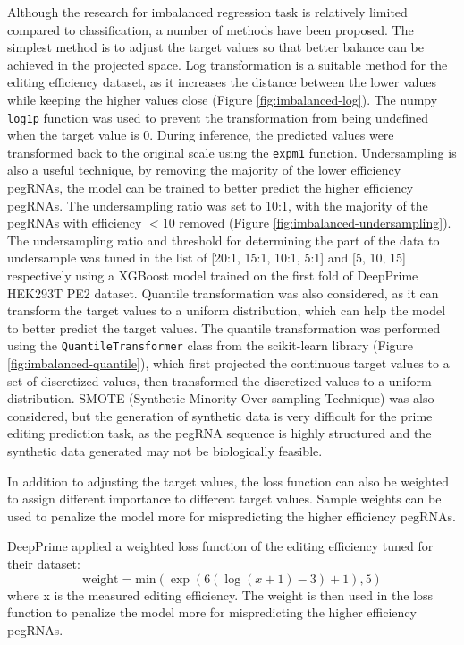 Although the research for imbalanced regression task is relatively limited compared to classification, a number of methods have been proposed\cite{krawczykLearningImbalancedData2016}. The simplest method is to adjust the target values so that better balance can be achieved in the projected space. Log transformation is a suitable method for the editing efficiency dataset, as it increases the distance between the lower values while keeping the higher values close (Figure \ref{fig:imbalanced-log}). The numpy \verb|log1p| function was used to prevent the transformation from being undefined when the target value is 0. During inference, the predicted values were transformed back to the original scale using the \verb|expm1| function. Undersampling is also a useful technique, by removing the majority of the lower efficiency pegRNAs, the model can be trained to better predict the higher efficiency pegRNAs\cite{torgoResamplingStrategiesRegression2015}. 
The undersampling ratio was set to 10:1, with the majority of the pegRNAs with efficiency $<10$ removed (Figure \ref{fig:imbalanced-undersampling}). The undersampling ratio and threshold for determining the part of the data to undersample was tuned in the list of [20:1, 15:1, 10:1, 5:1] and [5, 10, 15] respectively using a XGBoost model trained on the first fold of DeepPrime HEK293T PE2 dataset. Quantile transformation was also considered, as it can transform the target values to a uniform distribution, which can help the model to better predict the target values. The quantile transformation was performed using the \verb|QuantileTransformer| class from the scikit-learn library (Figure \ref{fig:imbalanced-quantile}), which first projected the continuous target values to a set of discretized values, then transformed the discretized values to a uniform distribution. SMOTE (Synthetic Minority Over-sampling Technique) was also considered, but the generation of synthetic data is very difficult for the prime editing prediction task, as the pegRNA sequence is highly structured and the synthetic data generated may not be biologically feasible. 

In addition to adjusting the target values, the loss function can also be weighted to assign different importance to different target values. Sample weights can be used to penalize the model more for mispredicting the higher efficiency pegRNAs. 

DeepPrime applied a weighted loss function of the editing efficiency tuned for their dataset:
\begin{equation}
    \text{weight} = \text{min}(\exp(6(\log(x+1)-3)+1),5)
\end{equation}
where x is the measured editing efficiency. The weight is then used in the loss function to penalize the model more for mispredicting the higher efficiency pegRNAs.


